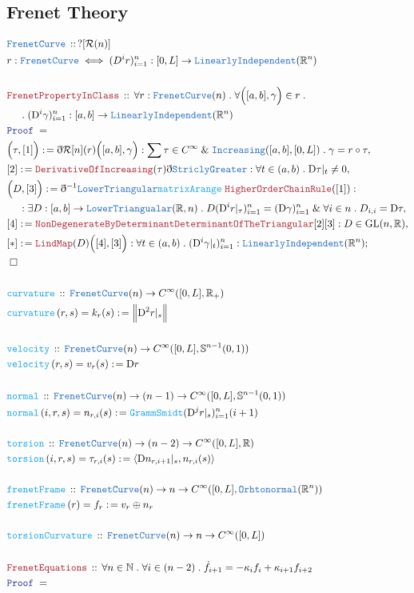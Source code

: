 \documentclass[12pt]{scrartcl}
\newcommand{\TYPE}[1]{\textcolor{NavyBlue}{\mathtt{#1}}}
\newcommand{\FUNC}[1]{\textcolor{Cerulean}{\mathtt{#1}}}
\newcommand{\LOGIC}[1]{\textcolor{Blue}{\mathtt{#1}}}
\newcommand{\THM}[1]{\textcolor{Maroon}{\mathtt{#1}}}
\renewcommand{\.}{\; . \;}
\newcommand{\de}{: \kern 0.1pc =}
\newcommand{\Act}[1]{\left( #1 \right)}
\newcommand{\Theorem}[2]{& \THM{#1} \, :: \, #2 \\ & \Proof = \\ }
\newcommand{\DeclareType}[2]{& \TYPE{#1} \, :: \, #2 \\}
\newcommand{\DefineType}[3]{& #1 : \TYPE{#2} \iff #3 \\}
\newcommand{\DeclareFunc}[2]{& \FUNC{#1} \, :: \, #2 \\}
\newcommand{\DefineNamedFunc}[4]{&  \FUNC{#1}\Act{#2} = #3 \de #4 \\}
\newcommand{\NewLine}{\\ & \kern 1pc}
\newcommand{\Page}[1]{ \begin{align*} #1 \end{align*}   }
\newcommand{ \bd }{ \ByDef }
\renewcommand{\And}{\; \& \;}
\newcommand{\Reals}{\mathbb{R} }
\newcommand{\Nat}{\mathbb{N} }
\newcommand{\Say}[3]{& #1 \de #2 : #3, \\}
\newcommand{\Conclude}[3]{& #1 \de #2 : #3; \\}
\newcommand{\QED}{\; \square}
\newcommand{\EndProof}{& \QED \\}
\newcommand{\ByDef}{\eth}
\newcommand{\Proof}{\LOGIC{Proof} \; }
\newcommand{\LI}{\TYPE{LinearlyIndependent}}
\newcommand{\diff}{\mathrm{D}}
\newcommand{\R}{\mathcal{R}}
\newcommand{\FC}{\TYPE{FrenetCurve}}
\begin{document}
\subsection{Frenet Theory}
\Page{
	\DeclareType{FrenetCurve}{?[\R(n)]}
	\DefineType{r}{FrenetCurve}{(D^i r)_{i=1}^n : [0,L] \to \LI(\Reals^n)}
	\\
	\Theorem{FrenetPropertyInClass}{\forall r : \FC(n) \. 
		\forall \Big([a,b],\gamma\Big) \in r \.  \NewLine \. (\diff^i \gamma)^n_{i=1} : [a,b] \to \LI(\Reals^n) }
	\Say{\Big(\tau,[1]\Big)}{\bd \R[n](r)\Big([a,b],\gamma\Big)}{ 
		\sum \tau \in C^\infty \And \TYPE{Increasing}([a,b],[0,L])  \.
		\gamma = r \circ \tau
	}
	\Say{[2]}{\THM{DerivativeOfIncreasing}(\tau)\bd\TYPE{StriclyGreater}}{\forall t \in (a,b) \. \diff \tau |_t \neq 0}
	\Say{\Big(D,[3]\Big)}{\bd^{-1}\TYPE{LowerTriangular}\FUNC{matrixArange}\;\THM{HigherOrderChainRule}([1])}
	{ \NewLine :
		\exists D : [a,b] \to \TYPE{LowerTriangualar}(\Reals,n) \.  
		D(\diff^i r|_\tau  )^n_{i=1} = (\diff \gamma)^n_{i=1}  \And \forall i \in n \. D_{i,i} = \diff \tau }
	\Say{[4]}{ \THM{NonDegenerateByDeterminant}\THM{DeterminantOfTheTriangular}[2][3]}{ D  \in \mathrm{GL}(n,\Reals)  }                      
	\Conclude{[*]}{\THM{LindMap}(D)\Big([4],[3]\Big)}{ \forall t \in (a,b) \. (\diff^i \gamma |_t)^n_{i=1} : \LI(\Reals^n) }
	\EndProof
	\\
	\DeclareFunc{curvature}{\FC(n) \to C^\infty([0,L], \Reals_+)}
	\DefineNamedFunc{curvature}{r,s}{k_r(s)}{\Big\|\diff^2 r|_s \Big\|}
	\\
	\DeclareFunc{velocity}{\FC(n) \to C^\infty([0,L],\mathbb{S}^{n-1}(0,1))}
	\DefineNamedFunc{velocity}{r,s}{v_r(s)}{\diff r}
	\\
	\DeclareFunc{normal}{\FC(n) \to (n-1) \to  C^\infty([0,L],\mathbb{S}^{n-1}(0,1))}
	\DefineNamedFunc{normal}{i,r,s}{n_{r,i}(s)}{\FUNC{GrammSmidt}(\diff^j r|_s )^n_{i=1}(i+1)}
	\\
	\DeclareFunc{torsion}{\FC(n) \to (n-2) \to C^\infty([0,L],\Reals)}
	\DefineNamedFunc{torsion}{i,r,s}{\tau_{r,i}(s)}{ \langle \diff n_{r,i + 1}|_s, n_{r,i}(s) \rangle  }
	\\
	\DeclareFunc{frenetFrame}{\FC(n) \to n \to C^\infty([0,L],\TYPE{Orhtonormal}(\Reals^n))}
	\DefineNamedFunc{frenetFrame}{r}{f_r}{v_r \oplus n_r}
	\\
	\DeclareFunc{torsionCurvature}{\FC(n) \to n \to C^\infty([0,L])}
	\\
	\Theorem{FrenetEquations}{
		\forall n \in \Nat \. \forall i \in (n- 2) \.  \dot f_{i+1} =  -\kappa_i f_i + \kappa_{i+1}f_{i + 2}
	}
}
\end{document}
